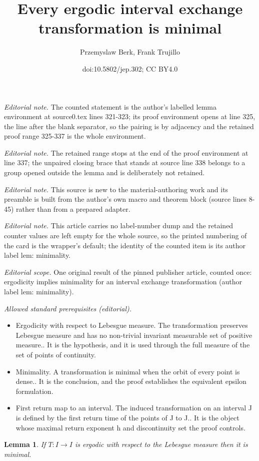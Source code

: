 \documentclass[10pt,a4paper]{article}
\title{Every ergodic interval exchange transformation is minimal}
\author{Przemyslaw Berk, Frank Trujillo}
\date{doi:10.5802/jep.302; CC BY4.0}
\theoremstyle{plain}
\newtheorem{lemma}[theorem]{Lemma}
\theoremstyle{definition}
\begin{document}
\maketitle
\noindent\textit{Editorial note.} The counted statement is the author's labelled lemma environment at source0.tex lines 321-323; its proof environment opens at line 325, the line after the blank separator, so the pairing is by adjacency and the retained proof range 325-337 is the whole environment.\par\medskip
\noindent\textit{Editorial note.} The retained range stops at the end of the proof environment at line 337; the unpaired closing brace that stands at source line 338 belongs to a group opened outside the lemma and is deliberately not retained.\par\medskip
\noindent\textit{Editorial note.} This source is new to the material-authoring work and its preamble is built from the author's own macro and theorem block (source lines 8-45) rather than from a prepared adapter.\par\medskip
\noindent\textit{Editorial note.} This article carries no label-number dump and the retained counter values are left empty for the whole source, so the printed numbering of the card is the wrapper's default; the identity of the counted item is its author label lem: minimality.\par\medskip
\noindent\textit{Editorial scope.} One original result of the pinned publisher article, counted once: ergodicity implies minimality for an interval exchange transformation (author label lem: minimality).\par\medskip
\noindent\textit{Allowed standard prerequisites (editorial).}\begin{itemize}
\item Ergodicity with respect to Lebesgue measure. The transformation preserves Lebesgue measure and has no non-trivial invariant measurable set of positive measure.. It is the hypothesis, and it is used through the full measure of the set of points of continuity.
\item Minimality. A transformation is minimal when the orbit of every point is dense.. It is the conclusion, and the proof establishes the equivalent epsilon formulation.
\item First return map to an interval. The induced transformation on an interval J is defined by the first return time of the points of J to J.. It is the object whose maximal return exponent h and discontinuity set the proof controls.
\end{itemize}\medskip
\begin{lemma}\label{lem: minimality}
If $T: I \to I$ is ergodic with respect to the Lebesgue measure then it is minimal.
\end{lemma}
\end{document}
